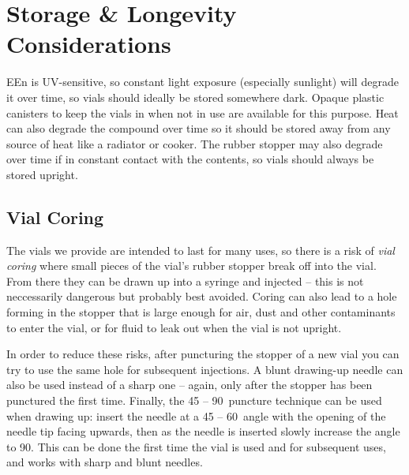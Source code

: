 \documentclass[twoside,a5paper]{article}
\begin{document}
\section{Storage \& Longevity Considerations}

EEn is UV-sensitive, so constant light exposure (especially sunlight)
will degrade it over time, so vials should ideally be stored somewhere
dark.  Opaque plastic canisters to keep the vials in when not in use
are available for this purpose.  Heat can also degrade the compound
over time so it should be stored away from any source of heat like a
radiator or cooker.  The rubber stopper may also degrade over time if
in constant contact with the contents, so vials should always be
stored upright.

\subsection{Vial Coring}

The vials we provide are intended to last for many uses, so there is a
risk of \textit{vial coring} where small pieces of the vial's rubber
stopper break off into the vial.  From there they can be drawn up into
a syringe and injected -- this is not neccessarily dangerous but
probably best avoided.  Coring can also lead to a hole forming in the
stopper that is large enough for air, dust and other contaminants to
enter the vial, or for fluid to leak out when the vial is not upright.

In order to reduce these risks, after puncturing the stopper of a new
vial you can try to use the same hole for subsequent injections.  A
blunt drawing-up needle can also be used instead of a sharp one --
again, only after the stopper has been punctured the first time.
Finally, the 45 -- 90\textdegree\ puncture technique can be used when
drawing up: insert the needle at a 45 -- 60\textdegree\ angle with the
opening of the needle tip facing upwards, then as the needle is
inserted slowly increase the angle to 90\textdegree.  This can be done
the first time the vial is used and for subsequent uses, and works
with sharp and blunt needles.
\end{document}
